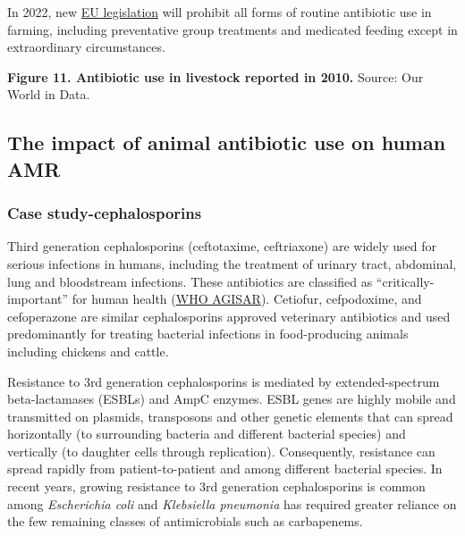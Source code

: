 \documentclass[
]{book}
\begin{document}
In 2022, new \href{https://eur-lex.europa.eu/legal-content/EN/TXT/PDF/?uri=CELEX:32019R0006\&from=EN}{EU legislation} will prohibit all forms of routine antibiotic use in farming, including preventative group treatments and medicated feeding except in extraordinary circumstances.

\textbf{Figure 11. Antibiotic use in livestock reported in 2010.} Source: Our World in Data.

\hypertarget{the-impact-of-animal-antibiotic-use-on-human-amr}{%
\subsection*{The impact of animal antibiotic use on human AMR}\label{the-impact-of-animal-antibiotic-use-on-human-amr}}

\hypertarget{case-study-cephalosporins}{%
\subsubsection*{Case study-cephalosporins}\label{case-study-cephalosporins}}

Third generation cephalosporins (ceftotaxime, ceftriaxone) are widely used for serious infections in humans, including the treatment of urinary tract, abdominal, lung and bloodstream infections. These antibiotics are classified as ``critically-important'' for human health (\href{http://www.agisar.org/}{WHO AGISAR}). Cetiofur, cefpodoxime, and cefoperazone are similar cephalosporins approved veterinary antibiotics and used predominantly for treating bacterial infections in food-producing animals including chickens and cattle.

Resistance to 3rd generation cephalosporins is mediated by extended-spectrum beta-lactamases (ESBLs) and AmpC enzymes. ESBL genes are highly mobile and transmitted on plasmids, transposons and other genetic elements that can spread horizontally (to surrounding bacteria and different bacterial species) and vertically (to daughter cells through replication). Consequently, resistance can spread rapidly from patient-to-patient and among different bacterial species. In recent years, growing resistance to 3rd generation cephalosporins is common among \emph{Escherichia coli} and \emph{Klebsiella pneumonia} has required greater reliance on the few remaining classes of antimicrobials such as carbapenems.
\end{document}
